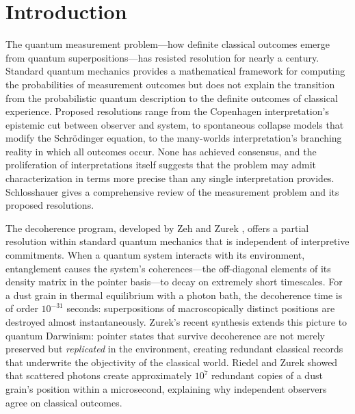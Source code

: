 \documentclass[12pt,a4paper]{article}
\theoremstyle{definition}
\theoremstyle{remark}
\begin{document}
\section{Introduction}
\label{sec:intro}

The quantum measurement problem---how definite classical outcomes emerge from quantum superpositions---has resisted resolution for nearly a century. Standard quantum mechanics provides a mathematical framework for computing the probabilities of measurement outcomes but does not explain the transition from the probabilistic quantum description to the definite outcomes of classical experience. Proposed resolutions range from the Copenhagen interpretation's epistemic cut between observer and system, to spontaneous collapse models that modify the Schr\"odinger equation, to the many-worlds interpretation's branching reality in which all outcomes occur. None has achieved consensus, and the proliferation of interpretations itself suggests that the problem may admit characterization in terms more precise than any single interpretation provides. Schlosshauer \cite{schlosshauer2005decoherence} gives a comprehensive review of the measurement problem and its proposed resolutions.

The decoherence program, developed by Zeh \cite{zeh1970interpretation} and Zurek \cite{zurek1981pointer,zurek2003decoherence}, offers a partial resolution within standard quantum mechanics that is independent of interpretive commitments. When a quantum system interacts with its environment, entanglement causes the system's coherences---the off-diagonal elements of its density matrix in the pointer basis---to decay on extremely short timescales. For a dust grain in thermal equilibrium with a photon bath, the decoherence time is of order $10^{-31}$ seconds: superpositions of macroscopically distinct positions are destroyed almost instantaneously. Zurek's recent synthesis \cite{zurek2025decoherence} extends this picture to quantum Darwinism: pointer states that survive decoherence are not merely preserved but \emph{replicated} in the environment, creating redundant classical records that underwrite the objectivity of the classical world. Riedel and Zurek \cite{riedel2010zurek} showed that scattered photons create approximately $10^7$ redundant copies of a dust grain's position within a microsecond, explaining why independent observers agree on classical outcomes.
\end{document}
